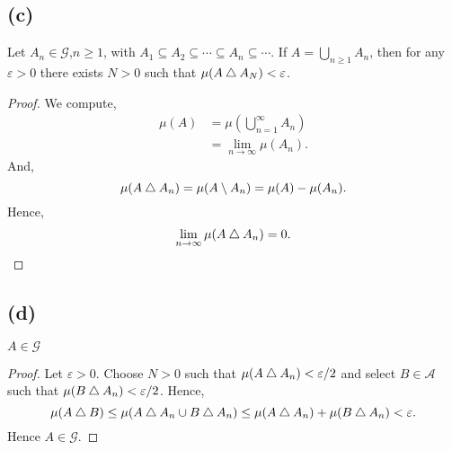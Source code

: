 \documentclass{unswmaths}
\begin{document}
\subsection*{(c)}
\begin{lemma}
    Let $A_n \in \mathcal{G}$,$n \geq 1$, with $A_1 \subseteq A_2 \subseteq \cdots \subseteq A_n \subseteq \cdots$. 
    If $A = \bigcup_{n\geq 1} A_n$, then 
    for any $\varepsilon > 0$ there exists $N > 0$ such that $\mu(A\bigtriangleup A_N) < \varepsilon$.
\end{lemma}
\begin{proof}
    We compute,
    \begin{align*}
        \mu(A) &= \mu(\bigcup_{n=1}^\infty A_n)\\
        &= \lim_{n\rightarrow\infty} \mu(A_n).
    \end{align*}
    And, 
    \begin{equation*}
        \mu(A\bigtriangleup A_n) = \mu(A\setminus A_n) = \mu(A)-\mu(A_n).
    \end{equation*}
    Hence,
    \begin{equation*}
        \lim_{n\rightarrow\infty} \mu(A\bigtriangleup A_n) = 0.
    \end{equation*}
\end{proof}
\subsection*{(d)}
\begin{corollary}
    $A \in \mathcal{G}$
\end{corollary}
\begin{proof}
    Let $\varepsilon > 0$. Choose $N > 0$ such that $\mu(A \bigtriangleup A_n) < \varepsilon/2$
    and select $B \in \mathcal{A}$ such that $\mu(B \bigtriangleup A_n) < \varepsilon/2$.
    Hence,
    \begin{equation*}
        \mu(A\bigtriangleup B) \leq \mu(A\bigtriangleup A_n \cup B\bigtriangleup A_n) \leq \mu(A\bigtriangleup A_n)+\mu(B\bigtriangleup A_n) < \varepsilon.
    \end{equation*}
    Hence $A \in \mathcal{G}$.
\end{proof}
\end{document}
